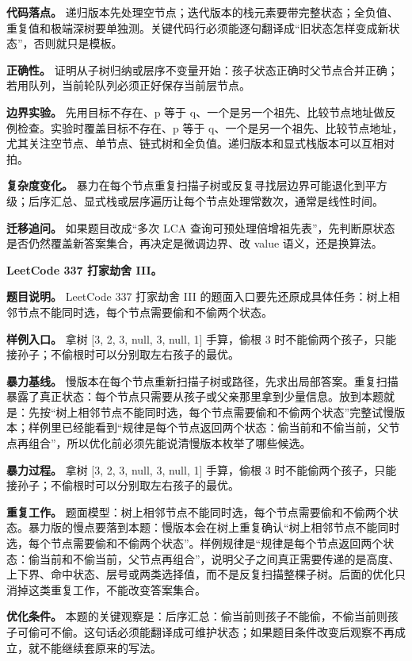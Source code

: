 \textbf{代码落点。} 递归版本先处理空节点；迭代版本的栈元素要带完整状态；全负值、重复值和极端深树要单独测。关键代码行必须能逐句翻译成“旧状态怎样变成新状态”，否则就只是模板。

\textbf{正确性。} 证明从子树归纳或层序不变量开始：孩子状态正确时父节点合并正确；若用队列，当前轮队列必须正好保存当前层节点。

\textbf{边界实验。} 先用目标不存在、p 等于 q、一个是另一个祖先、比较节点地址做反例检查。实验时覆盖目标不存在、p 等于 q、一个是另一个祖先、比较节点地址，尤其关注空节点、单节点、链式树和全负值。递归版本和显式栈版本可以互相对拍。

\textbf{复杂度变化。} 暴力在每个节点重复扫描子树或反复寻找层边界可能退化到平方级；后序汇总、显式栈或层序遍历让每个节点处理常数次，通常是线性时间。

\textbf{迁移追问。} 如果题目改成“多次 LCA 查询可预处理倍增祖先表”，先判断原状态是否仍然覆盖新答案集合，再决定是微调边界、改 value 语义，还是换算法。

\noindent\textbf{LeetCode 337 打家劫舍 III。}

\textbf{题目说明。} LeetCode 337 打家劫舍 III 的题面入口要先还原成具体任务：树上相邻节点不能同时选，每个节点需要偷和不偷两个状态。

\textbf{样例入口。} 拿树 [3, 2, 3, null, 3, null, 1] 手算，偷根 3 时不能偷两个孩子，只能接孙子；不偷根时可以分别取左右孩子的最优。

\textbf{暴力基线。} 慢版本在每个节点重新扫描子树或路径，先求出局部答案。重复扫描暴露了真正状态：每个节点只需要从孩子或父亲那里拿到少量信息。放到本题就是：先按“树上相邻节点不能同时选，每个节点需要偷和不偷两个状态”完整试慢版本；样例里已经能看到“规律是每个节点返回两个状态：偷当前和不偷当前，父节点再组合”，所以优化前必须先能说清慢版本枚举了哪些候选。

\textbf{暴力过程。} 拿树 [3, 2, 3, null, 3, null, 1] 手算，偷根 3 时不能偷两个孩子，只能接孙子；不偷根时可以分别取左右孩子的最优。

\textbf{重复工作。} 题面模型：树上相邻节点不能同时选，每个节点需要偷和不偷两个状态。暴力版的慢点要落到本题：慢版本会在树上重复确认“树上相邻节点不能同时选，每个节点需要偷和不偷两个状态”。样例规律是“规律是每个节点返回两个状态：偷当前和不偷当前，父节点再组合”，说明父子之间真正需要传递的是高度、上下界、命中状态、层号或两类选择值，而不是反复扫描整棵子树。后面的优化只消掉这类重复工作，不能改变答案集合。

\textbf{优化条件。} 本题的关键观察是：后序汇总：偷当前则孩子不能偷，不偷当前则孩子可偷可不偷。这句话必须能翻译成可维护状态；如果题目条件改变后观察不再成立，就不能继续套原来的写法。


